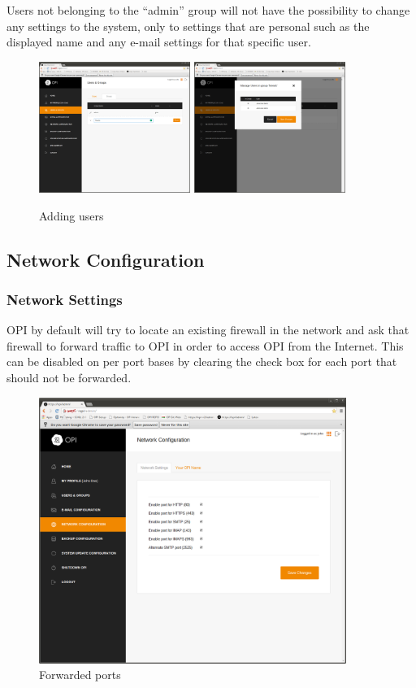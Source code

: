 \documentclass[12pt,a4paper,titlepage]{article}
\begin{document}
Users not belonging to the ``admin'' group will not have the possibility to change any settings to the system, only to settings that are personal such as the displayed name and any e-mail settings for that specific user.
\begin{figure}[h]
\centering
\includegraphics[width=4.93cm]{./img/groups-1}
\includegraphics[width=4.93cm]{./img/groups-2}
\caption{Adding users}
\end{figure}
\newpage
\subsection{Network Configuration}
\subsubsection{Network Settings}
OPI by default will try to locate an existing firewall in the network and ask that firewall to forward traffic to OPI in order to access OPI from the Internet. This can be disabled on per port bases by clearing the check box for each port that should not be forwarded.
\begin{figure}[h]
\centering
\includegraphics[width=10cm]{./img/network-config-1}
\caption{Forwarded ports}
\end{figure}
\end{document}
